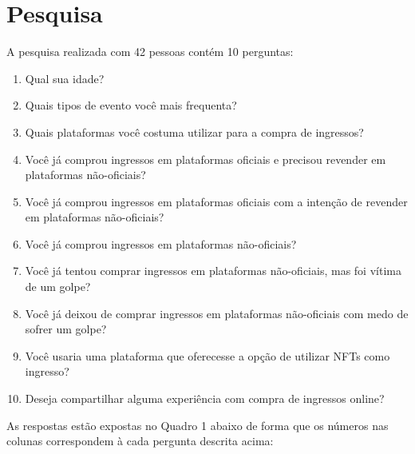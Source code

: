 \section{Pesquisa} \label{pesquisa}

A pesquisa realizada com 42 pessoas contém 10 perguntas:

\begin{enumerate} 
    \item {Qual sua idade?}
    
    \item {Quais tipos de evento você mais frequenta?}
    
    \item {Quais plataformas você costuma utilizar para a compra de ingressos?}
    
    \item {Você já comprou ingressos em plataformas oficiais e precisou revender em plataformas não-oficiais?}
    
    \item {Você já comprou ingressos em plataformas oficiais com a intenção de revender em plataformas não-oficiais?}

    \item {Você já comprou ingressos em plataformas não-oficiais?}

    \item {Você já tentou comprar ingressos em plataformas não-oficiais, mas foi vítima de um golpe?}

    \item {Você já deixou de comprar ingressos em plataformas não-oficiais com medo de sofrer um golpe?}

    \item {Você usaria uma plataforma que oferecesse a opção de utilizar NFTs como ingresso?}

    \item {Deseja compartilhar alguma experiência com compra de ingressos online?}

\end{enumerate}

As respostas estão expostas no Quadro 1 abaixo de forma que os números nas colunas correspondem à cada pergunta descrita acima:

